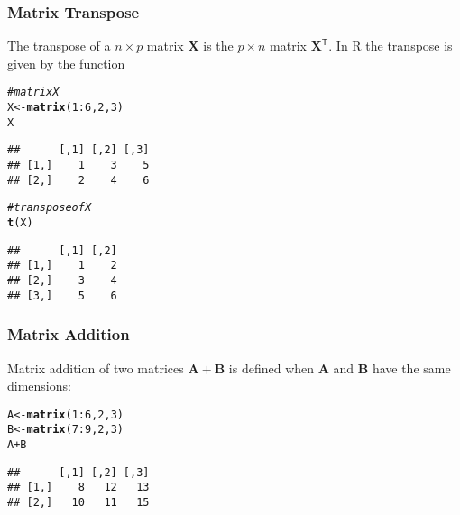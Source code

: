 \documentclass[12pt]{beamer}\usepackage[]{graphicx}\usepackage[]{color}
\makeatletter
\newcommand{\hlnum}[1]{\textcolor[rgb]{0.686,0.059,0.569}{#1}}%
\newcommand{\hlcom}[1]{\textcolor[rgb]{0.678,0.584,0.686}{\textit{#1}}}%
\newcommand{\hlopt}[1]{\textcolor[rgb]{0,0,0}{#1}}%
\newcommand{\hlstd}[1]{\textcolor[rgb]{0.345,0.345,0.345}{#1}}%
\newcommand{\hlkwb}[1]{\textcolor[rgb]{0.69,0.353,0.396}{#1}}%
\newcommand{\hlkwd}[1]{\textcolor[rgb]{0.737,0.353,0.396}{\textbf{#1}}}%
\newenvironment{kframe}{%
 \def\at@end@of@kframe{}%
 \ifinner\ifhmode%
  \def\at@end@of@kframe{\end{minipage}}%
  \begin{minipage}{\columnwidth}%
 \fi\fi%
 \def\FrameCommand##1{\hskip\@totalleftmargin \hskip-\fboxsep
 \colorbox{shadecolor}{##1}\hskip-\fboxsep
     \hskip-\linewidth \hskip-\@totalleftmargin \hskip\columnwidth}%
 \MakeFramed {\advance\hsize-\width
   \@totalleftmargin\z@ \linewidth\hsize
   \@setminipage}}%
 {\par\unskip\endMakeFramed%
 \at@end@of@kframe}
\newenvironment{knitrout}{}{} %
\makeatother
\begin{document}

\begin{frame}[fragile]
\frametitle{Matrix Transpose}

The transpose of a $n \times p$ matrix $\mathbf{X}$ is the $p \times n$ matrix 
$\mathbf{X}^{\mathsf{T}}$. In R the transpose is given by the function 

\begin{knitrout}\footnotesize
{}\color{fgcolor}\begin{kframe}
\begin{alltt}
\hlcom{# matrix X}
\hlstd{X} \hlkwb{<-} \hlkwd{matrix}\hlstd{(}\hlnum{1}\hlopt{:}\hlnum{6}\hlstd{,} \hlnum{2}\hlstd{,} \hlnum{3}\hlstd{)}
\hlstd{X}
\end{alltt}
\begin{verbatim}
##      [,1] [,2] [,3]
## [1,]    1    3    5
## [2,]    2    4    6
\end{verbatim}
\begin{alltt}
\hlcom{# transpose of X}
\hlkwd{t}\hlstd{(X)}
\end{alltt}
\begin{verbatim}
##      [,1] [,2]
## [1,]    1    2
## [2,]    3    4
## [3,]    5    6
\end{verbatim}
\end{kframe}
\end{knitrout}

\end{frame}


\begin{frame}[fragile]
\frametitle{Matrix Addition}

Matrix addition of two matrices $\mathbf{A} + \mathbf{B}$ is defined when 
$\mathbf{A}$ and $\mathbf{B}$ have the same dimensions:

\begin{knitrout}\footnotesize
{}\color{fgcolor}\begin{kframe}
\begin{alltt}
\hlstd{A} \hlkwb{<-} \hlkwd{matrix}\hlstd{(}\hlnum{1}\hlopt{:}\hlnum{6}\hlstd{,} \hlnum{2}\hlstd{,} \hlnum{3}\hlstd{)}
\hlstd{B} \hlkwb{<-} \hlkwd{matrix}\hlstd{(}\hlnum{7}\hlopt{:}\hlnum{9}\hlstd{,} \hlnum{2}\hlstd{,} \hlnum{3}\hlstd{)}
\hlstd{A} \hlopt{+} \hlstd{B}
\end{alltt}
\begin{verbatim}
##      [,1] [,2] [,3]
## [1,]    8   12   13
## [2,]   10   11   15
\end{verbatim}
\end{kframe}
\end{knitrout}

\end{frame}
\end{document}
